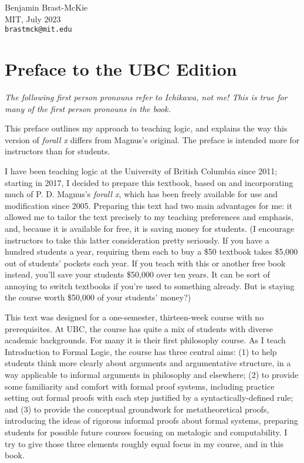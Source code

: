 \begin{flushright}
\textsf{Benjamin Brast-McKie} \\
\textsf{MIT, July 2023} \\
\texttt{brastmck@mit.edu}
\end{flushright}


\iffalse

\chapter*{Preface to the UBC Edition}
\label{ch.preface}

\textit{The following first person pronouns refer to Ichikawa, not me! This is true for many of the first person pronouns in the book.}

This preface outlines my approach to teaching logic, and explains the way this version of \emph{forall x} differs from Magnus's original. The preface is intended more for instructors than for students. 

I have been teaching logic at the University of British Columbia since 2011; starting in 2017, I decided to prepare this textbook, based on and incorporating much of P. D. Magnus's \emph{forall x}, which has been freely available for use and modification since 2005. Preparing this text had two main advantages for me: it allowed me to tailor the text precisely to my teaching preferences and emphasis, and, because it is available for free, it is saving money for students. (I encourage instructors to take this latter consideration pretty seriously. If you have a hundred students a year, requiring them each to buy a \$50 textbook takes \$5,000 out of students' pockets each year. If you teach with this or another free book instead, you'll save your students \$50,000 over ten years. It can be sort of annoying to switch textbooks if you're used to something already. But is staying the course worth \$50,000 of your students' money?)

This text was designed for a one-semester, thirteen-week course with no prerequisites. At UBC, the course has quite a mix of students with diverse academic backgrounds. For many it is their first philosophy course. As I teach Introduction to Formal Logic, the course has three central aims: (1) to help students think more clearly about arguments and argumentative structure, in a way applicable to informal arguments in philosophy and elsewhere; (2) to provide some familiarity and comfort with formal proof systems, including practice setting out formal proofs with each step justified by a syntactically-defined rule; and (3) to provide the conceptual groundwork for metatheoretical proofs, introducing the ideas of rigorous informal proofs about formal systems, preparing students for possible future courses focusing on metalogic and computability. I try to give those three elements roughly equal focus in my course, and in this book.

